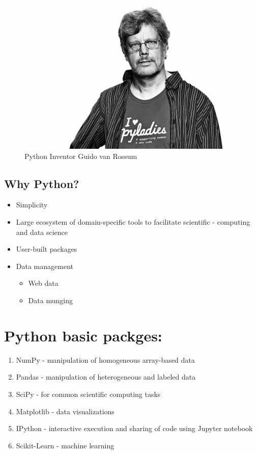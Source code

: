 \documentclass[]{book}
\providecommand{\tightlist}{%
  \setlength{\itemsep}{0pt}\setlength{\parskip}{0pt}}
\begin{document}
\begin{figure}

\hfill{}\includegraphics[width=0.5\linewidth]{Pythoninventor} 

\caption{Python Inventor Guido van Rossum}\label{fig:Pythoninventor}
\end{figure}

\hypertarget{why-python}{%
\subsection{Why Python?}\label{why-python}}

\begin{itemize}
\tightlist
\item
  Simplicity
\item
  Large ecosystem of domain-specific tools to facilitate scientific - computing and data science
\item
  User-built packages
\item
  Data management

  \begin{itemize}
  \tightlist
  \item
    Web data
  \item
    Data munging
  \end{itemize}
\end{itemize}

\hypertarget{python-basic-packges}{%
\section{Python basic packges:}\label{python-basic-packges}}

\begin{enumerate}
\def\labelenumi{\arabic{enumi}.}
\tightlist
\item
  NumPy - manipulation of homogeneous array-based data
\item
  Pandas - manipulation of heterogeneous and labeled data
\item
  SciPy - for common scientific computing tasks
\item
  Matplotlib - data visualizations
\item
  IPython - interactive execution and sharing of code using Jupyter notebook
\item
  Scikit-Learn - machine learning
\end{enumerate}
\end{document}

